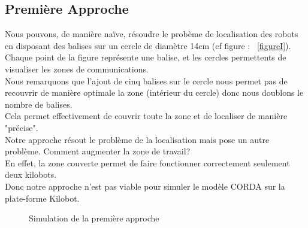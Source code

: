 \documentclass[a4paper,8pt]{report}
\begin{document}
\subsection*{Premi\`ere Approche}\label{sec:name}

Nous pouvons, de mani\`ere na\"{i}ve, r\'esoudre le prob\`eme de localisation des robots en disposant des balises sur un cercle de diam\`etre 14cm (cf figure : ~\ref{figureI}).\\
Chaque point de la figure repr\'esente une balise, et les cercles permettents de visualiser les zones de communications.\\
Nous remarquons que l'ajout de cinq balises sur le cercle nous permet pas de recouvrir de mani\`ere optimale la zone (int\'erieur du cercle) donc nous doublons le nombre de balises.\\
Cela permet effectivement de couvrir toute la zone et de localiser de mani\`ere "pr\'ecise".\\
Notre approche r\'esout le probl\`eme de la localisation mais pose un autre probl\`eme. Comment augmenter la zone de travail?\\
En effet, la zone couverte permet de faire fonctionner correctement seulement deux kilobots.\\
Donc notre approche n'est pas viable pour simuler le mod\`ele CORDA sur la plate-forme Kilobot.\\

\begin{figure}[!h]
    \centering
    \caption{Simulation de la première approche}
\end{figure}
\end{document}
